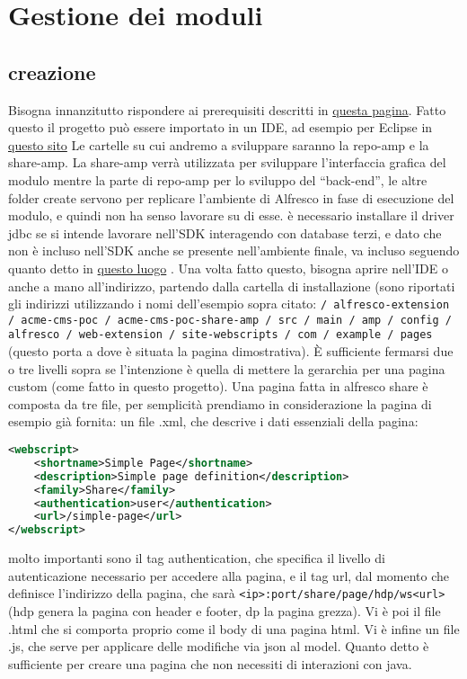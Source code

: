 \section{Gestione dei moduli}
\subsection{creazione}
Bisogna innanzitutto rispondere ai prerequisiti descritti in  \href{http://docs.alfresco.com/sdk2.1/concepts/alfresco-sdk-installing-prerequisite-software.html}{questa pagina}.
Fatto questo il progetto può essere importato in un IDE, ad esempio per Eclipse in \href{http://docs.alfresco.com/community/tasks/alfresco-sdk-rad-eclipse-import-projects.html}{questo sito}
Le cartelle su cui andremo a sviluppare saranno la repo-amp e la share-amp. La share-amp verrà utilizzata per sviluppare l’interfaccia grafica del modulo mentre la parte di repo-amp  per lo sviluppo del “back-end”, le altre folder create servono per replicare l’ambiente di Alfresco in fase di esecuzione del modulo, e quindi non ha senso lavorare su di esse.
è necessario installare il driver jdbc se si intende  lavorare nell’SDK interagendo con database terzi, e dato che non è incluso nell'SDK anche se presente nell'ambiente finale, va incluso seguendo quanto detto in  \href{https://community.alfresco.com/thread/213317-sdk-21-including-third-party-jar-libraries}{questo luogo} . 
Una volta fatto questo, bisogna aprire nell’IDE o anche a mano all’indirizzo, partendo dalla cartella di installazione (sono riportati gli indirizzi utilizzando i nomi dell’esempio sopra citato: \texttt{/ alfresco-extension / acme-cms-poc / acme-cms-poc-share-amp / src / main / amp / config / alfresco / web-extension / site-webscripts / com / example / pages}
 (questo porta a dove è situata la pagina dimostrativa). È sufficiente fermarsi due o tre livelli sopra se l’intenzione è quella di mettere la gerarchia per una pagina custom (come fatto in questo progetto).
Una pagina fatta in alfresco share è composta da tre file, per semplicità prendiamo in considerazione la pagina di esempio già fornita:
un file .xml, che descrive i dati essenziali della pagina:
\begin{lstlisting}[language=XML]
<webscript>
    <shortname>Simple Page</shortname>
    <description>Simple page definition</description>
    <family>Share</family>
    <authentication>user</authentication>
    <url>/simple-page</url>
</webscript>
\end{lstlisting}
molto importanti sono il tag authentication, che specifica il livello di autenticazione necessario per accedere alla pagina, e il tag url, dal momento che definisce l’indirizzo della pagina, che sarà \texttt{<ip>:port/share/page/hdp/ws<url>} (hdp genera la pagina con header e footer, dp la pagina grezza).
Vi è poi il file .html che si comporta proprio come il body di una pagina html.
Vi è infine un file .js, che serve per applicare delle modifiche via json al model.
Quanto detto è sufficiente per creare una pagina che non necessiti di interazioni con java.

